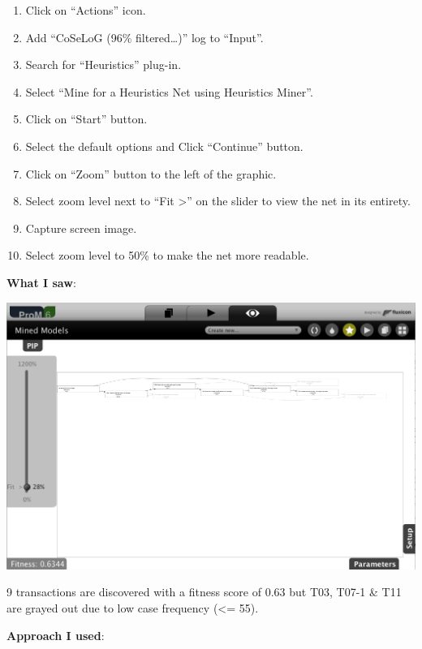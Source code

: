 \documentclass[]{article}
\begin{document}
\begin{enumerate}
\def\labelenumi{\arabic{enumi}.}
\setcounter{enumi}{29}
\itemsep1pt\parskip0pt
\item
  Click on ``Actions'' icon.\\
\item
  Add ``CoSeLoG (96\% filtered\ldots{})'' log to ``Input''.\\
\item
  Search for ``Heuristics'' plug-in.\\
\item
  Select ``Mine for a Heuristics Net using Heuristics Miner''.
\item
  Click on ``Start'' button.
\item
  Select the default options and Click ``Continue'' button.
\item
  Click on ``Zoom'' button to the left of the graphic.\\
\item
  Select zoom level next to ``Fit \textgreater{}'' on the slider to view
  the net in its entirety.
\item
  Capture screen image.\\
\item
  Select zoom level to 50\% to make the net more readable.
\end{enumerate}

\textbf{What I saw}:

\includegraphics{CoSeLoG_Step_05_Filter96_Heuristics_Net.png}

9 transactions are discovered with a fitness score of 0.63 but T03,
T07-1 \& T11 are grayed out due to low case frequency (\textless{}= 55).

\textbf{Approach I used}:
\end{document}
